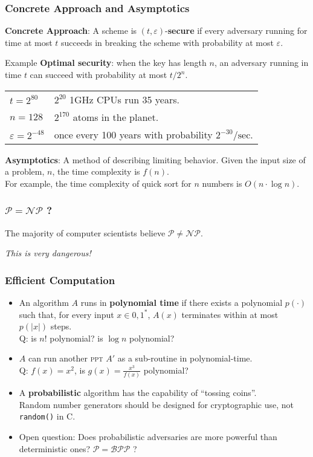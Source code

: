 \begin{frame}\frametitle{Concrete Approach and Asymptotics}
\textbf{Concrete Approach}: A scheme is $(t,\varepsilon)$-\textbf{secure} if every adversary running for time at most $t$ succeeds in breaking the scheme with probability at most $\varepsilon$.
\begin{exampleblock}{Example}
\textbf{Optimal security}: when the key has length $n$, an adversary running in time $t$ can succeed with probability at most $t/2^n$.
\begin{tabular}{ll}
$t=2^{80}$ & $2^{20}$ 1GHz CPUs run 35 years. \\
$n=128$   & $2^{170}$ atoms in the planet. \\
$\varepsilon=2^{-48}$  & once every 100 years with probability $2^{-30}/\text{sec}$. \\
\end{tabular}
\end{exampleblock}
\textbf{Asymptotics}: A method of describing limiting behavior. Given the input size of a problem, $n$, the time complexity is $f(n)$. \\
For example, the time complexity of quick sort for $n$ numbers is $O(n\cdot \log n)$.
\end{frame}
\begin{frame}\frametitle{$\mathcal{P} = \mathcal{NP}$ ?}
\begin{figure}
\begin{center}

\end{center}
\end{figure}
\centerline{The majority of computer scientists believe $\mathcal{P} \ne \mathcal{NP}$.}
\centerline{\alert{\emph{This is very dangerous!}}} 
\end{frame}
\begin{frame}[fragile]\frametitle{Efficient Computation}
\begin{itemize}
\item An algorithm $A$ runs in \textbf{polynomial time} if there exists a polynomial $p(\cdot)$ such that,
 for every input $x \in {0,1}^*$, $A(x)$ terminates within at most $p(|x|)$ steps. \\
 \alert{Q: is $n!$ polynomial? is $\log n$ polynomial?}
\item $A$ can run another \textsc{ppt} $A'$ as a sub-routine in polynomial-time.\\
 \alert{Q: $f(x) = x^{2} $, is $g(x) =  \frac{x^{3}}{f(x)}$ polynomial?}
\item A \textbf{probabilistic} algorithm has the capability of ``tossing coins''.\\
Random number generators should be designed for cryptographic use, not \verb|random()| in C. 
\item \alert{Open question}: Does probabilistic adversaries are more powerful than deterministic ones?  
$\mathcal{P} = \mathcal{BPP}$ ? 
\end{itemize}
\end{frame}
